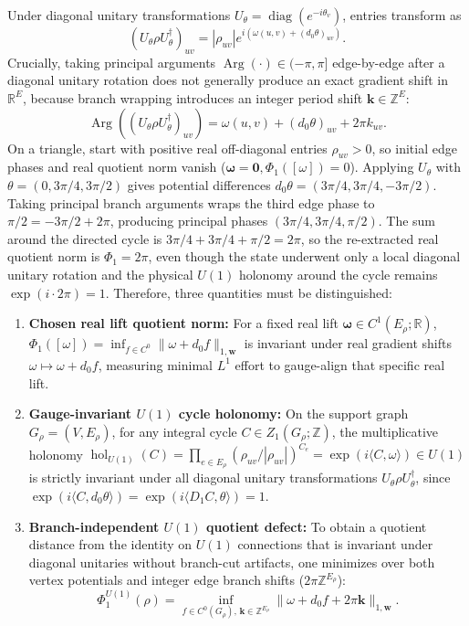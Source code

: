\documentclass[
]{article}
\providecommand{\tightlist}{%
  \setlength{\itemsep}{0pt}\setlength{\parskip}{0pt}}
\providecommand{\tightlist}{%
  \setlength{\itemsep}{0pt}\setlength{\parskip}{0pt}}
\begin{document}
\begin{enumerate}
  Under diagonal unitary transformations \(U_\theta = \operatorname{diag}(e^{-i \theta_v})\), entries transform as
  \[(U_\theta \rho U_\theta^\dagger)_{uv} = |\rho_{uv}| e^{i (\omega(u,v) + (d_0 \theta)_{uv})}.\]
  Crucially, taking principal arguments \(\operatorname{Arg}(\cdot) \in (-\pi, \pi]\) edge-by-edge after a diagonal unitary rotation does not generally produce an exact gradient shift in \(\mathbb{R}^E\), because branch wrapping introduces an integer period shift \(\mathbf{k} \in \mathbb{Z}^E\):
  \[\operatorname{Arg}((U_\theta \rho U_\theta^\dagger)_{uv}) = \omega(u,v) + (d_0 \theta)_{uv} + 2\pi k_{uv}.\]
  On a triangle, start with positive real off-diagonal entries \(\rho_{uv} > 0\), so initial edge phases and real quotient norm vanish (\(\boldsymbol{\omega} = \mathbf{0}, \Phi_1([\omega]) = 0\)). Applying \(U_\theta\) with \(\theta = (0, 3\pi/4, 3\pi/2)\) gives potential differences \(d_0 \theta = (3\pi/4, 3\pi/4, -3\pi/2)\). Taking principal branch arguments wraps the third edge phase to \(\pi/2 = -3\pi/2 + 2\pi\), producing principal phases \((3\pi/4, 3\pi/4, \pi/2)\). The sum around the directed cycle is \(3\pi/4 + 3\pi/4 + \pi/2 = 2\pi\), so the re-extracted real quotient norm is \(\Phi_1 = 2\pi\), even though the state underwent only a local diagonal unitary rotation and the physical \(U(1)\) holonomy around the cycle remains \(\exp(i \cdot 2\pi) = 1\).
  Therefore, three quantities must be distinguished:

  \begin{enumerate}
  \def\labelenumii{(\alph{enumii})}
  \tightlist
  \item
    \textbf{Chosen real lift quotient norm:} For a fixed real lift \(\boldsymbol{\omega} \in C^1(E_\rho; \mathbb{R})\), \(\Phi_1([\omega]) = \inf_{f \in C^0} \|\omega + d_0 f\|_{1,\mathbf{w}}\) is invariant under real gradient shifts \(\omega \mapsto \omega + d_0 f\), measuring minimal \(L^1\) effort to gauge-align that specific real lift.
  \item
    \textbf{Gauge-invariant \(U(1)\) cycle holonomy:} On the support graph \(G_\rho=(V,E_\rho)\), for any integral cycle \(C \in Z_1(G_\rho;\mathbb{Z})\), the multiplicative holonomy \(\operatorname{hol}_{U(1)}(C) = \prod_{e\in E_\rho} (\rho_{uv} / |\rho_{uv}|)^{C_e} = \exp(i \langle C, \omega \rangle) \in U(1)\) is strictly invariant under all diagonal unitary transformations \(U_\theta \rho U_\theta^\dagger\), since \(\exp(i \langle C, d_0 \theta \rangle) = \exp(i \langle D_1 C, \theta \rangle) = 1\).
  \item
    \textbf{Branch-independent \(U(1)\) quotient defect:} To obtain a quotient distance from the identity on \(U(1)\) connections that is invariant under diagonal unitaries without branch-cut artifacts, one minimizes over both vertex potentials and integer edge branch shifts (\(2\pi \mathbb{Z}^{E_\rho}\)):
    \[\Phi_1^{U(1)}(\rho) = \inf_{f \in C^0(G_\rho),\, \mathbf{k} \in \mathbb{Z}^{E_\rho}} \|\omega + d_0 f + 2\pi \mathbf{k}\|_{1, \mathbf{w}}.\]
  \end{enumerate}


\end{enumerate}
\end{document}
